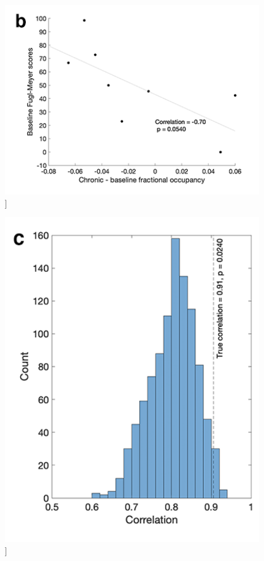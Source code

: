 \documentclass[phd,tocprelim]{cornell}
\renewcommand{\caption}[1]{\singlespacing\hangcaption{#1}\normalspacing}
\begin{document}
\null
\vfill
\clearpage
\null
\vfill
\begin{figure}[h!]
		\ContinuedFloat
		\captionsetup{labelformat=adja-page}
    \centering
    \includegraphics[width=1\textwidth]{chapter2/SupplementaryFig14b.png}
    \caption[]{}
\end{figure}
\null
\vfill
\clearpage
\null
\vfill
\begin{figure}[h!]
		\ContinuedFloat
		\captionsetup{labelformat=adja-page}
    \centering
    \includegraphics[width=1\textwidth]{chapter2/SupplementaryFig14c.png}
    \caption[]{}
\end{figure}
\end{document}
